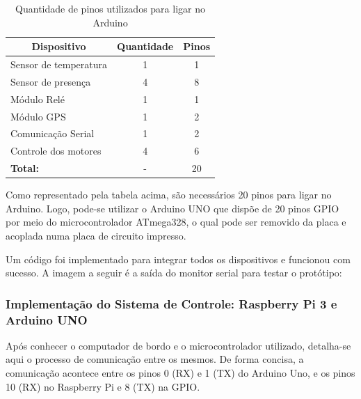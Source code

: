 \begin{table}[H]
\centering
\caption{Quantidade de pinos utilizados para ligar no Arduino}
\label{pinos_arduino}
\begin{tabular}{|l|c|c|}
\hline
\multicolumn{1}{|c|}{\textbf{Dispositivo}} & \multicolumn{1}{l|}{\textbf{Quantidade}} & \multicolumn{1}{l|}{\textbf{Pinos}} \\ \hline
Sensor de temperatura                      & 1                                        & 1                                   \\ \hline
Sensor de presença                         & 4                                        & 8                                   \\ \hline
Módulo Relé                                & 1                                        & 1                                   \\ \hline
Módulo GPS                                 & 1                                        & 2                                   \\ \hline
Comunicação Serial                         & 1                                        & 2                                   \\ \hline
Controle dos motores                       & 4                                        & 6                                   \\ \hline
\textbf{Total:}                            & -                                        & 20                                  \\ \hline
\end{tabular}
\end{table}

Como representado pela tabela acima, são necessários 20 pinos para ligar no Arduino. Logo, pode-se utilizar o Arduino UNO que dispõe de 20 pinos GPIO por meio do microcontrolador ATmega328, o qual pode ser removido da placa e acoplada numa placa de circuito impresso.

Um código foi implementado para integrar todos os dispositivos e funcionou com sucesso. A imagem a seguir é a saída do monitor serial para testar o protótipo:


\subsubsection{ Implementação do Sistema de Controle: Raspberry Pi 3 e Arduino UNO}

Após conhecer o computador de bordo e o microcontrolador utilizado, detalha-se aqui o processo de comunicação entre os mesmos.
De forma concisa, a comunicação acontece entre os pinos  0 (RX) e 1 (TX) do Arduino Uno, e os pinos 10 (RX) no Raspberry Pi e 8 (TX) na GPIO.


